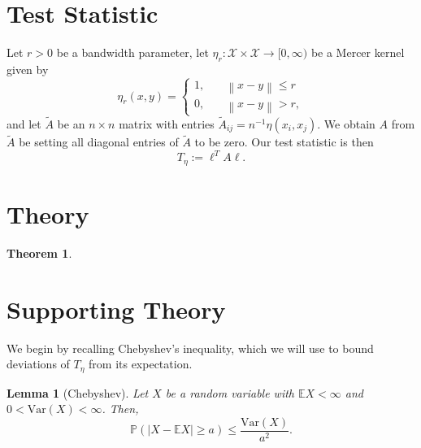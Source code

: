 \documentclass{article}
\newcommand{\norm}[1]{\left\lVert#1\right\rVert}
\newcommand{\abs}[1]{\left \lvert #1 \right \rvert}
\newcommand{\Var}{\mathrm{Var}}
\newcommand{\1}{\mathbb{I}}
\newcommand{\Pbb}{\mathbb{P}}
\newcommand{\Ebb}{\mathbb{E}}
\theoremstyle{alden}
\theoremstyle{aldenthm}
\newtheorem{theorem}{Theorem}
\newtheorem{lemma}{Lemma}
\theoremstyle{definition}
\theoremstyle{remark}
\begin{document}
\section{Test Statistic}

Let $r > 0$ be a bandwidth parameter, let $\eta_r: \mathcal{X} \times \mathcal{X} \to [0,\infty)$ be a Mercer kernel given by
\begin{equation*}
\eta_r(x,y) =
\begin{cases}
1, \quad & \textrm{$\norm{x - y} \leq r$} \\
0, \quad & \textrm{$\norm{x - y} > r$},
\end{cases}
\end{equation*}
and let $\widetilde{A}$ be an $n \times n$ matrix with entries $\widetilde{A}_{ij} = n^{-1}\eta(x_i,x_j)$. We obtain $A$ from $\widetilde{A}$ be setting all diagonal entries of $\widetilde{A}$ to be zero. Our test statistic is then
\begin{equation*}
T_{\eta} := \ell^T A \ell.
\end{equation*}

\section{Theory}

\begin{theorem}
	
\end{theorem}

\section{Supporting Theory}

We begin by recalling Chebyshev's inequality, which we will use to bound deviations of $T_{\eta}$ from its expectation.
\begin{lemma}[Chebyshev]
	\label{lem: chebyshev}
	Let $X$ be a random variable with $\Ebb X < \infty$ and $0 < \Var(X) < \infty$. Then,
	\begin{equation*}
	\Pbb(\abs{X - \Ebb X} \geq a) \leq \frac{\Var(X)}{a^2}.
	\end{equation*}
\end{lemma}
\end{document}
